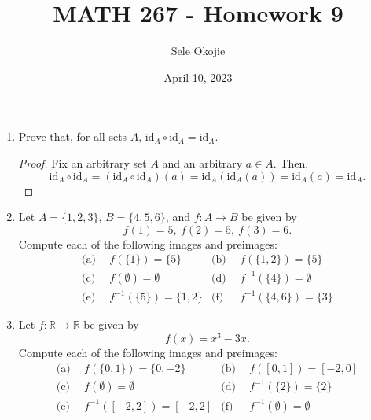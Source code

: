 \documentclass{article}
\title{MATH 267 - Homework 9}
\author{Sele Okojie}
\date{April 10, 2023}
\begin{document}
    \maketitle

    \begin{enumerate}

        \item Prove that, for all sets $A$, $\mathrm{id}_A \circ \mathrm{id}_A = \mathrm{id}_A$.
            \begin{proof}
                Fix an arbitrary set $A$ and an arbitrary $a\in A$. Then,
                \[
                    \mathrm{id}_A \circ \mathrm{id}_A = (\mathrm{id}_A \circ \mathrm{id}_A)(a) = \mathrm{id}_A(\mathrm{id}_A(a)) = \mathrm{id}_A(a) = \mathrm{id}_A.
                \]
            \end{proof}

	\item Let $A = \{ 1, 2, 3 \}$, $B = \{ 4, 5, 6 \}$, and $f : A \rightarrow B$ be given by
		\[
			f(1) = 5, \ f(2) = 5, \ f(3) = 6.
		\]
		Compute each of the following images and preimages:
		\begin{align*}
			\text{(a)} & \ \ f(\{ 1 \}) = \{ 5 \} & \text{(b)} & \ \ f(\{ 1, 2 \}) = \{ 5 \} \\
			\text{(c)} & \ \ f( \emptyset ) = \emptyset & \text{(d)} & \ \ f^{-1}(\{ 4 \}) = \emptyset \\
			\text{(e)} & \ \ f^{-1}(\{ 5 \}) = \{ 1, 2 \} & \text{(f)} & \ \ f^{-1}(\{ 4, 6 \}) = \{ 3 \}
		\end{align*}

	\item Let $f : \mathbb{R} \rightarrow \mathbb{R}$ be given by
		\[
			f(x) = x^3 - 3x.
		\]
		Compute each of the following images and preimages:
		\begin{align*}
			\text{(a)} & \ \ f(\{0, 1\}) = \{ 0, \minus2 \} & \text{(b)} & \ \ f([0,1]) = [\minus2, 0] \\
			\text{(c)} & \ \ f(\emptyset) = \emptyset & \text{(d)} & \ \ f^{-1}(\{ 2 \}) = \{ 2 \} \\
			\text{(e)} & \ \ f^{-1}([-2,2]) = [\minus2, 2] & \text{(f)} & \ \ f^{-1}(\emptyset) = \emptyset
		\end{align*}


\end{enumerate}
\end{document}
